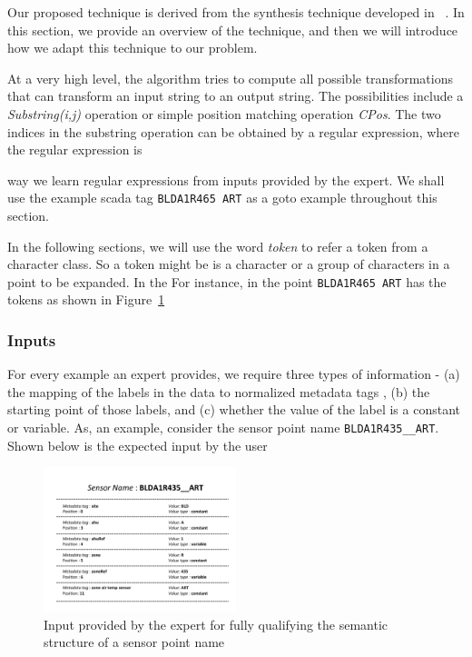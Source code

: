 Our proposed technique is derived from the synthesis technique developed in ~\cite{}. In this section, we provide an overview of the technique, and then we will introduce how we adapt this technique to our problem. 

At a very high level, the algorithm tries to compute all possible transformations that can transform an input string to an output string. The possibilities include a {\it Substring(i,j)} operation or simple position matching operation {\it{CPos}}. The two indices in the substring operation can be obtained by a regular expression, where the regular expression is  



 way we learn regular expressions from inputs provided by the expert. We shall use the example scada tag {\tt BLDA1R465  ART} as a goto example throughout this section.

In the following sections, we will use the word {\it token} to refer a token from a character class. So a token might be is a character or a group of characters in a point to be expanded. In the For instance, in the point {\tt BLDA1R465 ART} has the tokens as shown in Figure~\ref{fig:exampleInput}


\subsubsection{Inputs}

For every example an expert provides, we require three types of information - (a) the mapping of the labels in the data to normalized metadata tags , (b) the starting point of those labels, and (c) whether the value of the label is a constant or variable. As, an example, consider the sensor point name \texttt{BLDA1R435\_\_ART}. Shown below is the expected input by the user
\begin{figure}[h!]
  
  \centering
    \includegraphics[width=0.5\textwidth]{figs/inputExample.pdf}
\caption{Input provided by the expert for fully qualifying the semantic structure of a sensor point name}
\label{fig:exampleInput}
\end{figure}




